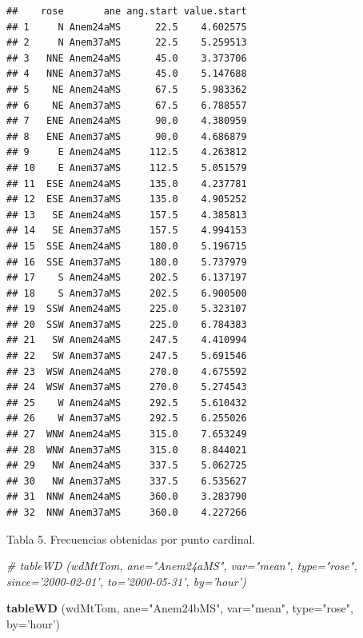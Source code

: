 \documentclass[]{article}
\newenvironment{Shaded}{\begin{snugshade}}{\end{snugshade}}
\newcommand{\KeywordTok}[1]{\textcolor[rgb]{0.13,0.29,0.53}{\textbf{{#1}}}}
\newcommand{\DataTypeTok}[1]{\textcolor[rgb]{0.13,0.29,0.53}{{#1}}}
\newcommand{\StringTok}[1]{\textcolor[rgb]{0.31,0.60,0.02}{{#1}}}
\newcommand{\CommentTok}[1]{\textcolor[rgb]{0.56,0.35,0.01}{\textit{{#1}}}}
\newcommand{\NormalTok}[1]{{#1}}
\begin{document}
\begin{verbatim}
##    rose       ane ang.start value.start
## 1     N Anem24aMS      22.5    4.602575
## 2     N Anem37aMS      22.5    5.259513
## 3   NNE Anem24aMS      45.0    3.373706
## 4   NNE Anem37aMS      45.0    5.147688
## 5    NE Anem24aMS      67.5    5.983362
## 6    NE Anem37aMS      67.5    6.788557
## 7   ENE Anem24aMS      90.0    4.380959
## 8   ENE Anem37aMS      90.0    4.686879
## 9     E Anem24aMS     112.5    4.263812
## 10    E Anem37aMS     112.5    5.051579
## 11  ESE Anem24aMS     135.0    4.237781
## 12  ESE Anem37aMS     135.0    4.905252
## 13   SE Anem24aMS     157.5    4.385813
## 14   SE Anem37aMS     157.5    4.994153
## 15  SSE Anem24aMS     180.0    5.196715
## 16  SSE Anem37aMS     180.0    5.737979
## 17    S Anem24aMS     202.5    6.137197
## 18    S Anem37aMS     202.5    6.900500
## 19  SSW Anem24aMS     225.0    5.323107
## 20  SSW Anem37aMS     225.0    6.784383
## 21   SW Anem24aMS     247.5    4.410994
## 22   SW Anem37aMS     247.5    5.691546
## 23  WSW Anem24aMS     270.0    4.675592
## 24  WSW Anem37aMS     270.0    5.274543
## 25    W Anem24aMS     292.5    5.610432
## 26    W Anem37aMS     292.5    6.255026
## 27  WNW Anem24aMS     315.0    7.653249
## 28  WNW Anem37aMS     315.0    8.844021
## 29   NW Anem24aMS     337.5    5.062725
## 30   NW Anem37aMS     337.5    6.535627
## 31  NNW Anem24aMS     360.0    3.283790
## 32  NNW Anem37aMS     360.0    4.227266
\end{verbatim}

Tabla 5. Frecuencias obtenidas por punto cardinal.

\begin{Shaded}
\begin{Highlighting}[]
\CommentTok{# tableWD (wdMtTom, ane="Anem24aMS", var="mean", type="rose", since='2000-02-01', to='2000-05-31', by='hour')}

\KeywordTok{tableWD} \NormalTok{(wdMtTom, }\DataTypeTok{ane=}\StringTok{"Anem24bMS"}\NormalTok{, }\DataTypeTok{var=}\StringTok{"mean"}\NormalTok{, }\DataTypeTok{type=}\StringTok{"rose"}\NormalTok{,  }\DataTypeTok{by=}\StringTok{'hour'}\NormalTok{)}
\end{Highlighting}
\end{Shaded}
\end{document}

